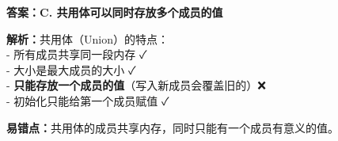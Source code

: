 \documentclass[12pt,a4paper]{ctexart}
\begin{document}
\begin{answerbox}
	\textbf{答案：C. 共用体可以同时存放多个成员的值}

	\textbf{解析：}共用体（Union）的特点：\\
	- 所有成员共享同一段内存 ✓\\
	- 大小是最大成员的大小 ✓\\
	- \textbf{只能存放一个成员的值}（写入新成员会覆盖旧的）❌\\
	- 初始化只能给第一个成员赋值 ✓

	\textbf{易错点：}共用体的成员共享内存，同时只能有一个成员有意义的值。
\end{answerbox}
\end{document}
